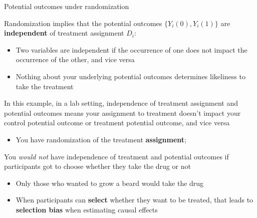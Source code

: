\begin{frame}{Potential outcomes under randomization}


Randomization implies that the potential outcomes $\{Y_i (0),  Y_i (1)\}$ are \textbf{independent} of treatment assignment $D_i$:
\begin{itemize}
\item Two variables are independent if the occurrence of one does not impact the occurrence of the other, and vice versa
\item Nothing about your underlying potential outcomes determines likeliness to take the treatment 
\end{itemize}

\vspace{2ex}
In this example, in a lab setting, independence of treatment assignment and potential outcomes means your assignment to treatment doesn't impact your control potential outcome or treatment potential outcome, and vice versa
\begin{itemize}
\item You have randomization of the treatment \textbf{assignment}; 
\end{itemize}

\vspace{2ex}
You \emph{would not} have independence of treatment and potential outcomes if participants got to choose whether they take the drug or not
\begin{itemize}
\item Only those who wanted to grow a beard would take the drug
\item When participants can \textbf{select} whether they want to be treated,  that leads to \textbf{selection bias} when estimating causal effects
\end{itemize}

\vspace{2ex}




\end{frame}


%
%
%
%
%





